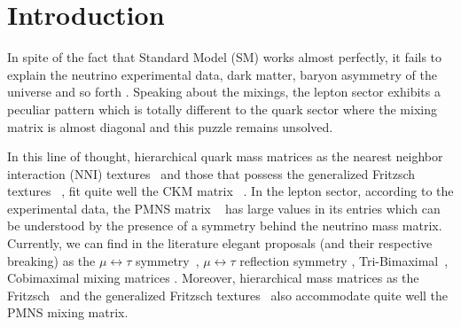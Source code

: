\documentclass[aps,prd,groupaddress,floatfix,tighten,nofootinbib,showpacs,amsfonts,superscriptaddress]{revtex4-2}
\begin{document}
\section{Introduction}
%

In spite of the fact that Standard Model (SM) works
almost perfectly, it fails to explain the neutrino experimental data, dark matter, baryon asymmetry of the universe and so forth \cite{Masiero:2005ua}. Speaking about the mixings, the lepton sector exhibits a peculiar pattern which is totally different to the quark sector where
the mixing matrix is almost diagonal and this puzzle remains unsolved.


In this line of thought, hierarchical quark mass matrices
as the nearest neighbor interaction (NNI) textures~\cite{Branco:1988iq, Branco:1994jx, Harayama:1996am, Harayama:1996jr} and those that 
possess the generalized Fritzsch textures ~\cite{Fritzsch:2015gxa}, fit quite well the CKM  matrix ~\cite{Cabibbo:1963yz, Kobayashi:1973fv}. 
In the lepton sector, according to the experimental data,
the PMNS matrix ~\cite{Maki:1962mu, Pontecorvo:1967fh} has large values in its entries which can be understood by the presence of a symmetry behind the neutrino mass matrix. Currently, we can find in the literature elegant proposals (and their respective breaking) as the $\mu\leftrightarrow \tau$ symmetry~\cite{Fukuyama:1997ky, Mohapatra:1998ka, Lam:2001fb, Kitabayashi:2002jd, Grimus:2003kq, Xing:2015fdg,Koide:2003rx, Fukuyama:2020swd},
$\mu\leftrightarrow \tau$ reflection symmetry \cite{Ahn:2008hy, Nishi:2016wki, Chen:2016ica, Chen:2015siy, Zhao:2017yvw, Liu:2017frs, Zhao:2018vxy,Nath:2018hjx}, Tri-Bimaximal~\cite{Harrison2002167, Xing200285, Altarelli:2012ss, Rahat:2018sgs, Perez:2019aqq, Rahat:2020mio}, Cobimaximal mixing matrices \cite{Fukuura:1999ze, Miura:2000sx, Ma:2002ce,Ferreira:2016sbb, Ma:2016nkf, Ma:2017moj, Ma:2017trv, Grimus:2017itg,CarcamoHernandez:2017owh,CarcamoHernandez:2018hst,CarcamoHernandez:2020udg}. Moreover, hierarchical mass matrices as the Fritzsch~ \cite{Fritzsch:2015foa} and the generalized Fritzsch textures~\cite{Fritzsch:2015gxa} also accommodate quite well the PMNS mixing matrix. 
\end{document}
